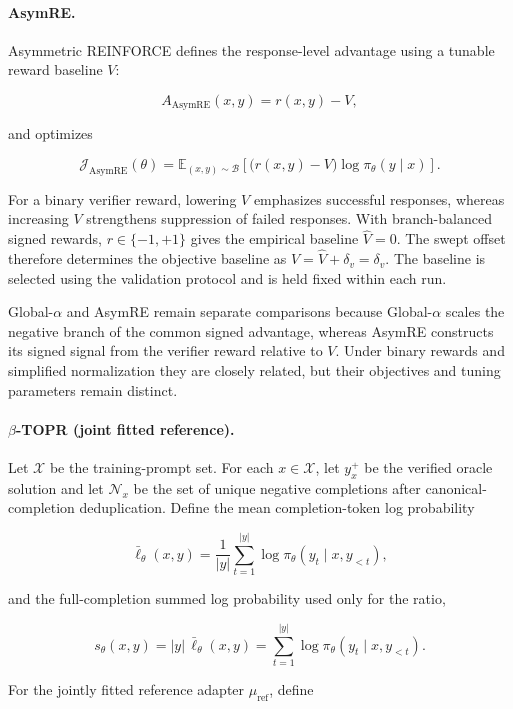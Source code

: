 \documentclass{article}
\theoremstyle{plain}
\theoremstyle{definition}
\theoremstyle{remark}
\begin{document}
\paragraph{AsymRE.}

Asymmetric REINFORCE defines the response-level advantage using a
tunable reward baseline \(V\):

\[
A_{\mathrm{AsymRE}}(x,y)
=
r(x,y)-V,
\]

and optimizes

\[
\mathcal{J}_{\mathrm{AsymRE}}(\theta)
=
\mathbb{E}_{(x,y)\sim\mathcal{B}}
\left[
\bigl(r(x,y)-V\bigr)
\log\pi_\theta(y\mid x)
\right].
\]

For a binary verifier reward, lowering \(V\) emphasizes successful
responses, whereas increasing \(V\) strengthens suppression of failed
responses. With branch-balanced signed rewards,
\(r\in\{-1,+1\}\) gives the empirical baseline
\(\widehat V=0\). The swept offset therefore determines the
objective baseline as
\(V=\widehat V+\delta_v=\delta_v\). The baseline is selected using the validation protocol and
is held fixed within each run.

Global-\(\alpha\) and AsymRE remain separate comparisons because
Global-\(\alpha\) scales the negative branch of the common signed advantage,
whereas AsymRE constructs its signed signal from the verifier reward relative
to \(V\). Under binary rewards and simplified normalization they are closely
related, but their objectives and tuning parameters remain distinct.

\paragraph{\(\beta\)-TOPR (joint fitted reference).}

Let \(\mathcal X\) be the training-prompt set. For each
\(x\in\mathcal X\), let \(y_x^+\) be the verified oracle solution and
let \(\mathcal N_x\) be the set of unique negative completions after
canonical-completion deduplication. Define the mean completion-token log
probability

\[
\bar{\ell}_\theta(x,y)
=
\frac{1}{|y|}
\sum_{t=1}^{|y|}
\log\pi_\theta(y_t\mid x,y_{<t}),
\]

and the full-completion summed log probability used only for the ratio,

\[
s_\theta(x,y)
=
|y|\,\bar{\ell}_\theta(x,y)
=
\sum_{t=1}^{|y|}
\log\pi_\theta(y_t\mid x,y_{<t}).
\]

For the jointly fitted reference adapter \(\mu_{\mathrm{ref}}\), define
\end{document}
